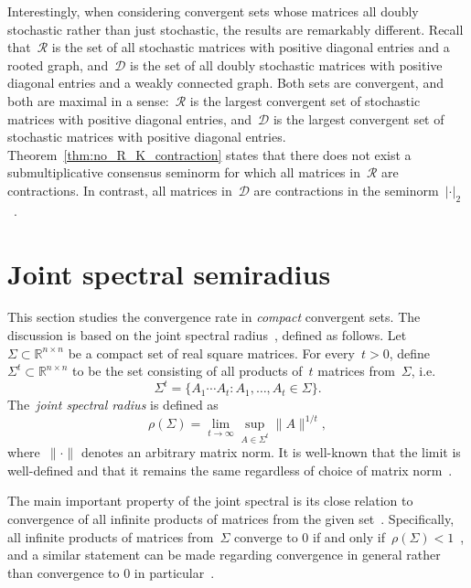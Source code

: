 \documentclass[letterpaper, 10 pt, conference]{ieeeconf}  %
\newcommand{\R}{\mathbb R}
\newcommand{\gensn}[1]{|#1|} %
\newcommand{\stocpd}{\mathcal{R}} %
\newcommand{\dblstocpd}{\mathcal{D}} %
\newcommand{\jsr}{\rho}
\begin{document}
Interestingly, when considering convergent sets whose matrices all doubly stochastic rather than just stochastic, the results are remarkably different. Recall that~$\stocpd$ is the set of all stochastic matrices with positive diagonal entries and a rooted graph, and~$\dblstocpd$ is the set of all doubly stochastic matrices with positive diagonal entries and a weakly connected graph. Both sets are convergent, and both are maximal in a sense:~$\stocpd$ is the largest convergent set of stochastic matrices with positive diagonal entries, and~$\dblstocpd$ is the largest convergent set of stochastic matrices with positive diagonal entries. Theorem~\ref{thm:no_R_K_contraction} states that there does not exist a submultiplicative consensus seminorm for which all matrices in~$\stocpd$ are contractions. In contrast, all matrices in~$\dblstocpd$ are contractions in the seminorm~$\gensn{\cdot}_2$~\cite{Liu2011DetGossip}.

\section{Joint spectral semiradius}

This section studies the convergence rate in \emph{compact} convergent sets. The discussion is based on the joint spectral radius~\cite{Rota1960JSR}, defined as follows. Let~$\Sigma \subset \R^{n \times n}$ be a compact set of real square matrices. For every~$t > 0$, define~$\Sigma^t \subset \R^{n \times n}$ to be the set consisting of all products of~$t$ matrices from~$\Sigma$, i.e.
\begin{equation}
    \Sigma^t = \{ A_1 \cdots A_t : A_1,\dots,A_t \in \Sigma\}.
\end{equation}
The~\emph{joint spectral radius} is defined as
\begin{equation}\label{eq:jsr}
    \jsr(\Sigma) = \lim_{t \to \infty} \sup_{A \in \Sigma^t} \|A\|^{1/t},
\end{equation}
where~$\|\cdot\|$ denotes an arbitrary matrix norm. It is well-known that the limit is well-defined and that it remains the same regardless of choice of matrix norm~\cite{Jungers2009JSR}.

The main important property of the joint spectral is its close relation to convergence of all infinite products of matrices from the given set~\cite{Daubechies1992RCP}. Specifically, all infinite products of matrices from~$\Sigma$ converge to 0 if and only if~$\jsr(\Sigma) < 1$~\cite{Berger1992Semigroups}, and a similar statement can be made regarding convergence in general rather than convergence to 0 in particular~\cite{Daubechies1992RCP,Berger1992Semigroups}.
\end{document}
